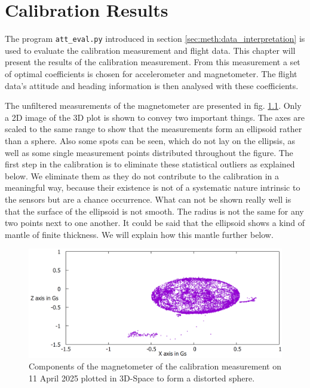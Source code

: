 \chapter{Calibration Results \label{ch:calibration_results}}
The program \verb|att_eval.py| introduced in section \ref{sec:meth:data_interpretation} is used to evaluate the calibration measurement and flight data. This chapter will present the results of the calibration measurement. From this measurement a set of optimal coefficients is chosen for accelerometer and magnetometer. The flight data's attitude and heading information is then analysed with these coefficients.

The unfiltered measurements of the magnetometer are presented in fig. \ref{fig:res:raw_cali}. Only a 2D image of the 3D plot is shown to convey two important things. The axes are scaled to the same range to show that the measurements form an ellipsoid rather than a sphere. Also some spots can be seen, which do not lay on the ellipsis, as well as some single measurement points distributed throughout the figure. The first step in the calibration is to eliminate these statistical outliers as explained below. We eliminate them as they do not contribute to the calibration in a meaningful way, because their existence is not of a systematic nature intrinsic to the sensors but are a chance occurrence. What can not be shown really well is that the surface of the ellipsoid is not smooth. The radius is not the same for any two points next to one another. It could be said that the ellipsoid shows a kind of mantle of finite thickness. We will explain how this mantle further below.

\begin{figure}[H]
    \centering
    \includegraphics[width=\linewidth]{images/04_results/raw_sphere_2025-04-11_x_z_axes.png}
    \caption{Components of the magnetometer of the calibration measurement on 11 April 2025 plotted in 3D-Space to form a distorted sphere.}
    \label{fig:res:raw_cali}
\end{figure}

